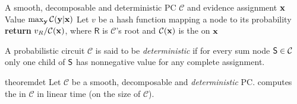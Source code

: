 \begin{algorithm}[t]
  \caption{}\label{alg:map}
  \begin{algorithmic}[1]
    \Require A smooth, decomposable and deterministic PC $\mathcal{C}$ and evidence assignment $\mathbf{x}$
    \Ensure Value $\max_{\mathbf{y}}\mathcal{C}(\mathbf{y}|\mathbf{x})$
    \State Let $v$ be a hash function mapping a node to its probability
    \EndFor%
    \State \textbf{return} $v_{\normalfont{R}}/\mathcal{C}(\mathbf{x})$, where $\textsf{R}$ is
    $\mathcal{C}$'s root and $\mathcal{C}(\mathbf{x})$ is the \evi{} on $\mathbf{x}$
  \end{algorithmic}
\end{algorithm}

\begin{definition}[Determinism]
  A probabilistic circuit $\mathcal{C}$ is said to be \emph{deterministic} if for every sum node
  $\operatorname{\textup{\textsf{S}}}\in\mathcal{C}$ only one child of $\operatorname{\textup{\textsf{S}}}$ has nonnegative value for any complete assignment.
\end{definition}

\begin{restatable}{theorem}{det}
  \label{thm:det}
  Let $\mathcal{C}$ be a smooth, decomposable and \emph{deterministic} PC.
  \textup{} computes the \map{} in $\mathcal{C}$ in linear time (on the size
  of $\mathcal{C}$).
\end{restatable}

